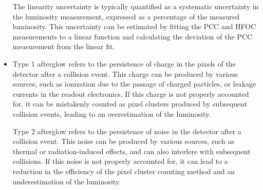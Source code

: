 \begin{itemize}
  The linearity uncertainty is typically quantified as a systematic uncertainty in the luminosity measurement, expressed as a percentage of the measured luminosity. This uncertainty can be estimated by fitting the PCC and HFOC measurements to a linear function and calculating the deviation of the PCC measurement from the linear fit.

\item Type 1 afterglow refers to the persistence of charge in the pixels of the detector after a collision event. This charge can be produced by various sources, such as ionization due to the passage of charged particles, or leakage currents in the readout electronics. If this charge is not properly accounted for, it can be mistakenly counted as pixel clusters produced by subsequent collision events, leading to an overestimation of the luminosity.

  Type 2 afterglow refers to the persistence of noise in the detector after a collision event. This noise can be produced by various sources, such as thermal or radiation-induced effects, and can also interfere with subsequent collisions. If this noise is not properly accounted for, it can lead to a reduction in the efficiency of the pixel cluster counting method and an underestimation of the luminosity.

\end{itemize}
